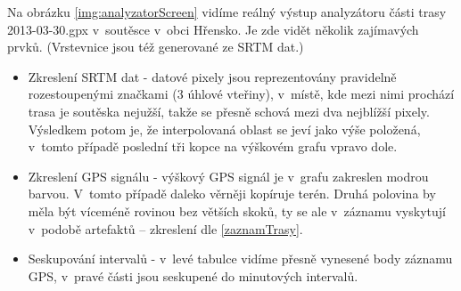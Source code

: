 \documentclass[thesis=B,czech]{FITthesis}[2012/06/26]
\begin{document}
Na obrázku \ref{img:analyzatorScreen} vidíme reálný výstup analyzátoru části trasy 2013-03-30.gpx v~soutěsce v~obci Hřensko. Je zde vidět několik zajímavých prvků. (Vrstevnice jsou též generované ze SRTM dat.)
\begin{itemize}
\item{Zkreslení SRTM dat - datové pixely jsou reprezentovány pravidelně rozestoupenými značkami (3 úhlové vteřiny), v~místě, kde mezi nimi prochází trasa je soutěska nejužší, takže se přesně schová mezi dva nejblížší pixely. Výsledkem potom je, že interpolovaná oblast se jeví jako výše položená, v~tomto případě poslední tři kopce na výškovém grafu vpravo dole. }

\item{Zkreslení GPS signálu - výškový GPS signál je v~grafu zakreslen modrou barvou. V~tomto případě daleko věrněji kopíruje terén. Druhá polovina by měla být víceméně rovinou bez větších skoků, ty se ale v~záznamu vyskytují v~podobě artefaktů -- zkreslení dle \ref{zaznamTrasy}.}

\item{Seskupování intervalů - v~levé tabulce vidíme přesně vynesené body záznamu GPS, v~pravé části jsou seskupené do minutových intervalů.}

\end{itemize}
\end{document}
